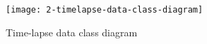 \begin{figure}[!ht]
\centering
\texttt{[image: 2-timelapse-data-class-diagram]}
\caption{Time-lapse data class diagram}\label{timelapse_data_class_diagram}
\end{figure}




